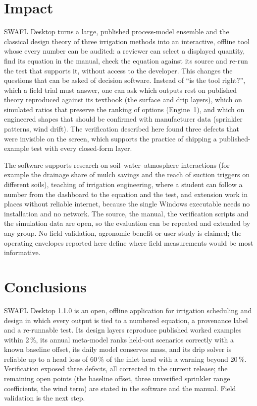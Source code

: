 \documentclass[preprint,12pt]{elsarticle}
\begin{document}
\section{Impact}
SWAFL Desktop turns a large, published process-model ensemble and the classical design theory of three irrigation methods into an interactive, offline tool whose every number can be audited: a reviewer can select a displayed quantity, find its equation in the manual, check the equation against its source and re-run the test that supports it, without access to the developer. This changes the questions that can be asked of decision software. Instead of ``is the tool right?'', which a field trial must answer, one can ask which outputs rest on published theory reproduced against its textbook (the surface and drip layers), which on simulated ratios that preserve the ranking of options (Engine~1), and which on engineered shapes that should be confirmed with manufacturer data (sprinkler patterns, wind drift). The verification described here found three defects that were invisible on the screen, which supports the practice of shipping a published-example test with every closed-form layer.

The software supports research on soil--water--atmosphere interactions (for example the drainage share of mulch savings and the reach of suction triggers on different soils), teaching of irrigation engineering, where a student can follow a number from the dashboard to the equation and the test, and extension work in places without reliable internet, because the single Windows executable needs no installation and no network. The source, the manual, the verification scripts and the simulation data are open, so the evaluation can be repeated and extended by any group. No field validation, agronomic benefit or user study is claimed; the operating envelopes reported here define where field measurements would be most informative.

\section{Conclusions}
SWAFL Desktop 1.1.0 is an open, offline application for irrigation scheduling and design in which every output is tied to a numbered equation, a provenance label and a re-runnable test. Its design layers reproduce published worked examples within 2\,\%, its annual meta-model ranks held-out scenarios correctly with a known baseline offset, its daily model conserves mass, and its drip solver is reliable up to a head loss of 60\,\% of the inlet head with a warning beyond 20\,\%. Verification exposed three defects, all corrected in the current release; the remaining open points (the baseline offset, three unverified sprinkler range coefficients, the wind term) are stated in the software and the manual. Field validation is the next step.
\end{document}
